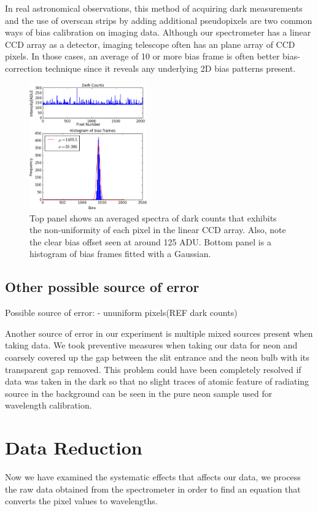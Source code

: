 \documentclass[authoryear, 12pt,5p, times]{elsarticle}
\begin{document}
In real astronomical observations, this method of acquiring dark measurements and the use of overscan strips by adding additional pseudopixels are two common ways of bias calibration on imaging data. Although our spectrometer has a linear CCD array as a detector, imaging telescope often has an plane array of CCD pixels. In those cases, an average of 10 or more bias frame is often better bias-correction technique since it reveals any underlying 2D bias patterns present. 
 \begin{figure}[h!]
\includegraphics[width=0.45\textwidth]{figures/dark&biashisto}
\caption{Top panel shows an averaged spectra of dark counts that exhibits the non-uniformity of each pixel in the linear CCD array. Also, note the clear bias offset seen at around 125 ADU. Bottom panel is a histogram of bias frames fitted with a Gaussian. } 
\label{dark_counts}
\end{figure}


\subsection{Other possible source of error}
Possible source of error: 
- ununiform pixels(REF dark counts)

Another source of error in our experiment is multiple mixed sources present when taking data. We took preventive measures when taking our data for neon and coarsely covered up the gap between the slit entrance and the neon bulb with its transparent gap removed. This problem could have been completely resolved if data was taken in the dark so that no slight traces of atomic feature of radiating source in the background can be seen in the pure neon sample used for wavelength calibration.
\section{Data Reduction}
 Now we have examined the systematic effects that affects our data, we process the raw data obtained from the spectrometer in order to find an equation that converts the pixel values to wavelengths.
\end{document}
